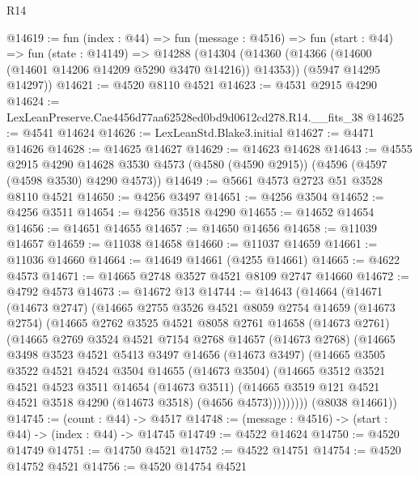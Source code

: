 \begin{lexlean}{R14}
\begin{coremodule}
@14619 := fun (index : @44) =>
  fun (message : @4516) =>
  fun (start : @44) =>
  fun (state : @14149) =>
  @14288
    (@14304
      (@14360 (@14366 (@14600 (@14601 @14206 @14209 @5290 @3470 @14216)) @14353))
      (@5947 @14295 @14297))
@14621 := @4520 @8110 @4521
@14623 := @4531 @2915 @4290
@14624 := LexLeanPreserve.Cae4456d77aa62528ed0bd9d0612cd278.R14.__fits_38
@14625 := @4541 @14624
@14626 := LexLeanStd.Blake3.initial
@14627 := @4471 @14626
@14628 := @14625 @14627
@14629 := @14623 @14628
@14643 := @4555
    @2915
    @4290
    @14628
    @3530
    @4573
    (@4580 (@4590 @2915))
    (@4596 (@4597 (@4598 @3530) @4290 @4573))
@14649 := @5661 @4573 @2723 @51 @3528 @8110 @4521
@14650 := @4256 @3497
@14651 := @4256 @3504
@14652 := @4256 @3511
@14654 := @4256 @3518 @4290
@14655 := @14652 @14654
@14656 := @14651 @14655
@14657 := @14650 @14656
@14658 := @11039 @14657
@14659 := @11038 @14658
@14660 := @11037 @14659
@14661 := @11036 @14660
@14664 := @14649 @14661 (@4255 @14661)
@14665 := @4622 @4573
@14671 := @14665 @2748 @3527 @4521 @8109 @2747 @14660
@14672 := @4792 @4573
@14673 := @14672 @13
@14744 := @14643
    (@14664
      (@14671
        (@14673 @2747)
        (@14665
          @2755
          @3526
          @4521
          @8059
          @2754
          @14659
          (@14673 @2754)
          (@14665
            @2762
            @3525
            @4521
            @8058
            @2761
            @14658
            (@14673 @2761)
            (@14665
              @2769
              @3524
              @4521
              @7154
              @2768
              @14657
              (@14673 @2768)
              (@14665
                @3498
                @3523
                @4521
                @5413
                @3497
                @14656
                (@14673 @3497)
                (@14665
                  @3505
                  @3522
                  @4521
                  @4524
                  @3504
                  @14655
                  (@14673 @3504)
                  (@14665
                    @3512
                    @3521
                    @4521
                    @4523
                    @3511
                    @14654
                    (@14673 @3511)
                    (@14665 @3519 @121 @4521 @4521 @3518 @4290 (@14673 @3518) (@4656 @4573)))))))))
      (@8038 @14661))
@14745 := (count : @44) -> @4517
@14748 := (message : @4516) -> (start : @44) -> (index : @44) -> @14745
@14749 := @4522 @14624
@14750 := @4520 @14749
@14751 := @14750 @4521
@14752 := @4522 @14751
@14754 := @4520 @14752 @4521
@14756 := @4520 @14754 @4521

\end{coremodule}
\end{lexlean}
